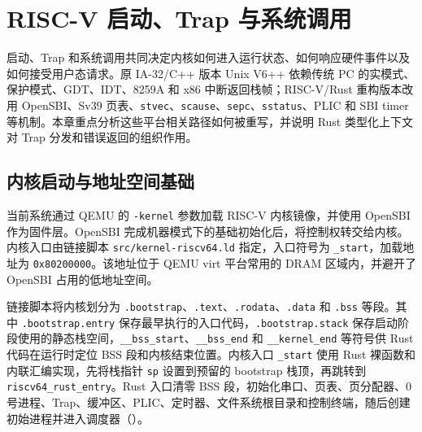 \chapter{RISC-V 启动、Trap 与系统调用}\label{chap:trap-syscall}

启动、Trap 和系统调用共同决定内核如何进入运行状态、如何响应硬件事件以及如何接受用户态请求。原 IA-32/C++ 版本 Unix V6++ 依赖传统 PC 的实模式、保护模式、GDT、IDT、8259A 和 x86 中断返回栈帧；RISC-V/Rust 重构版本改用 OpenSBI、Sv39 页表、\texttt{stvec}、\texttt{scause}、\texttt{sepc}、\texttt{sstatus}、PLIC 和 SBI timer 等机制\cite{riscv_privileged_20211203,qemu_riscv_doc}。本章重点分析这些平台相关路径如何被重写，并说明 Rust 类型化上下文对 Trap 分发和错误返回的组织作用。

\section{内核启动与地址空间基础}

当前系统通过 QEMU 的 \verb|-kernel| 参数加载 RISC-V 内核镜像，并使用 OpenSBI 作为固件层。OpenSBI 完成机器模式下的基础初始化后，将控制权转交给内核。内核入口由链接脚本 \verb|src/kernel-riscv64.ld| 指定，入口符号为 \verb|_start|，加载地址为 \verb|0x80200000|。该地址位于 QEMU virt 平台常用的 DRAM 区域内，并避开了 OpenSBI 占用的低地址空间。

链接脚本将内核划分为 \verb|.bootstrap|、\verb|.text|、\verb|.rodata|、\verb|.data| 和 \verb|.bss| 等段。其中 \verb|.bootstrap.entry| 保存最早执行的入口代码，\verb|.bootstrap.stack| 保存启动阶段使用的静态栈空间，\verb|__bss_start|、\verb|__bss_end| 和 \verb|__kernel_end| 等符号供 Rust 代码在运行时定位 BSS 段和内核结束位置。内核入口 \verb|_start| 使用 Rust 裸函数和内联汇编实现，先将栈指针 \verb|sp| 设置到预留的 bootstrap 栈顶，再跳转到 \verb|riscv64_rust_entry|。Rust 入口清零 BSS 段，初始化串口、页表、页分配器、0 号进程、Trap、缓冲区、PLIC、定时器、文件系统根目录和控制终端，随后创建初始进程并进入调度器（）。

